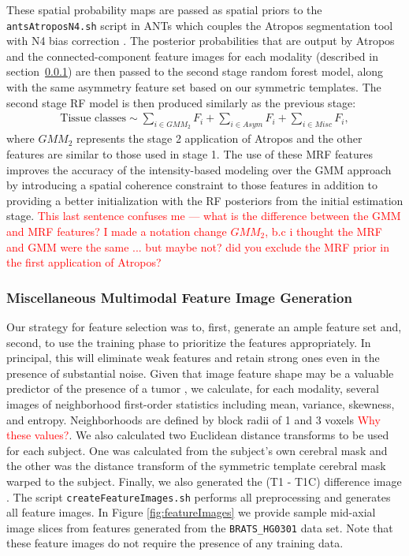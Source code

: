 \documentclass[preprint,authoryear,review,12pt]{elsarticle}
\begin{document}
These spatial probability maps are passed as spatial priors to the
{\tt antsAtroposN4.sh} script in ANTs which couples the Atropos 
segmentation tool \citep{avants2011} with N4 bias correction \citep{tustison2010}.
The posterior probabilities that are output by Atropos and the
connected-component feature images for each modality (described in
section~\ref{sec:misc}) are then passed to the second stage random
forest model, along with the same asymmetry feature set based on our
symmetric templates.  
The second stage RF model is then produced similarly as the previous stage: 
\begin{align}
\label{eq:mapmrf}
\mathrm{Tissue}\,\,\mathrm{classes} \sim \sum_{i \in GMM_2} F_i + \sum_{i \in Asym} F_i + \sum_{i \in Misc} F_i,
\end{align}
where $GMM_2$ represents the stage 2 application of Atropos and the
other features are similar to those used in stage 1.
The use of these MRF features improves the accuracy of the 
intensity-based modeling over the GMM approach by introducing
a spatial coherence constraint to those features in addition to 
providing a better initialization with the RF posteriors from 
the initial estimation stage.  \textcolor{red}{This last sentence
  confuses me --- what is the difference between the GMM and MRF
  features?  I made a notation change $GMM_2$, b.c i thought the MRF
  and GMM were the same ... but maybe not?  did you exclude the MRF
  prior in the first application of Atropos?}


\subsubsection{Miscellaneous Multimodal Feature Image Generation}
\label{sec:misc}
Our strategy for feature selection was to, first, generate an ample feature
set and, second, to use the training phase to prioritize the features
appropriately.  In principal, this will eliminate weak features and
retain strong ones even in the presence of substantial noise.  Given
that image feature shape may be a valuable predictor of the presence of a
tumor \cite{zacharaki2009classification}, we calculate, for each modality, several images of neighborhood 
first-order statistics including mean, variance, skewness, and
entropy.  Neighborhoods are defined by block radii
of 1 and 3 voxels \textcolor{red}{Why these values?}.  We also calculated two Euclidean distance
transforms \citep{maurer2003} to be used for each subject.  One was
calculated from the subject's own cerebral mask and the other was the 
distance transform of the symmetric template cerebral mask warped
to the subject.  Finally, we also generated the  (T1 - T1C) difference 
image \citep{prastawa2003}.
The script {\tt createFeatureImages.sh} performs all preprocessing
and generates all feature images.  In Figure \ref{fig:featureImages} we provide sample mid-axial 
image slices from features generated from the {\tt BRATS\_HG0301} data
set.  Note that these feature images do not require the presence of
any training data.
\end{document}
